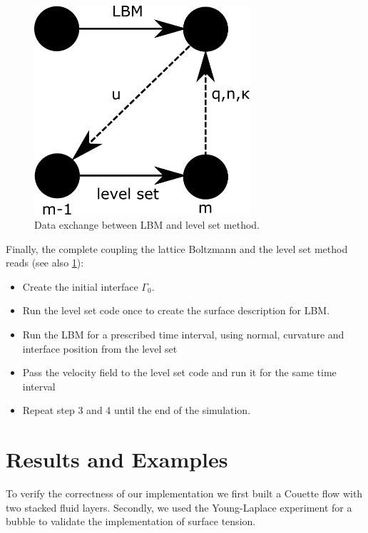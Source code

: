 \documentclass[final,leqno,onefignum,onetabnum]{siamltexmm}
\begin{document}
\begin{figure}
	\hfill\includegraphics[width=8cm,natwidth=632,natheight=562]{dataexchange.png}\hspace*{\fill}
	\caption{Data exchange between LBM and level set method.}
	\label{dataexchange}
\end{figure}
Finally, the complete coupling the lattice Boltzmann and the level set method reads (see also \cref{dataexchange}):
\begin{itemize}
	\item[1.] Create the initial interface $\Gamma_0$.
	\item[2.] Run the level set code once to create the surface description for LBM.
	\item[3.] Run the LBM  for a prescribed time interval, using normal, curvature and interface position from the level set
	\item[4.] Pass the velocity field to the level set code and run it for the same time interval
	\item[5.] Repeat step 3 and 4 until the end of the simulation.
\end{itemize}

\section{Results and Examples}
To verify the correctness of our implementation we first built a Couette flow with two stacked fluid layers. Secondly, we used the Young-Laplace experiment for a bubble to validate the implementation of surface tension.
\end{document}
